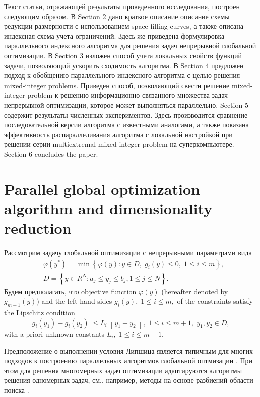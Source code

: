 \documentclass[
11pt,%
tightenlines,%
twoside,%
onecolumn,%
nofloats,%
nobibnotes,%
nofootinbib,%
superscriptaddress,%
noshowpacs,%
centertags]%
{revtex4}
\begin{document}
Текст статьи, отражающей результаты проведенного исследования, построен следующим образом. 
В Section 2 дано краткое описание описание схемы редукции размерности с использованием space-filling curves, а также описана индексная схема учета ограничений. Здесь же приведена формулировка параллельного индексного алгоритма для решения задач непрерывной глобальной оптимизации.
В Section 3 изложен способ учета локальных свойств функций задачи, позволяющий ускорить сходимость алгоритма.
В Section 4 предложен подход к обобщению параллельного индексного алгоритма с целью решения mixed-integer problems. Приведен способ, позволяющий свести решение mixed-integer problem к решению информационно-связанного множества задач непрерывной оптимизации, которое может выполняться параллельно. 
Section 5 содержит результаты численных экспериментов. Здесь производится сравнение последовательной версии алгоритма с известными аналогами, а также показана эффективность распараллеливания алгоритма с локальной настройкой при решении серии multiextremal mixed-integer problem на суперкомпьютере.  
Section 6 concludes the paper.

\section{Parallel global optimization algorithm and dimensionality reduction}

Рассмотрим задачу глобальной оптимизации с непрерывными параметрами вида
\begin{eqnarray}\label{problem}
&\varphi(y^\ast)=\min{\left\{\varphi(y):y\in D, \; g_i(y)\leq 0, \; 1 \leq i \leq m\right\}},\\
&D=\left\{y\in R^N: a_j\leq y_j \leq b_j, 1\leq j \leq N \right\}.\label{D}
\end{eqnarray}
Будем предполагать, что objective function $\varphi(y)$ (hereafter denoted by $g_{m+1}(y)$) and the left-hand sides $g_i(y), \; 1\leq i \leq m,$ of the constraints satisfy the Lipschitz condition 
\[
\left|g_i(y_1)-g_i(y_2)\right|\leq L_i\left\|y_1-y_2\right\|, \;1\leq i\leq m+1, \; y_1,y_2 \in D,\;
\]
with a priori unknown constants $L_i, \; 1 \leq i \leq m+1$. 

Предположение о выполнении условия Липшица является типичным для многих подходов к построению параллельных алгоритмов глобальной оптмизации \cite{Evtushenko2009,Zilinskas2011}. При этом для решения многомерных задач оптимизации адаптируются алгоритмы решения одномерных задач, см., например, методы на основе разбиений области поиска \cite{Zilinskas2014,Sergeyev2017}.
\end{document}
